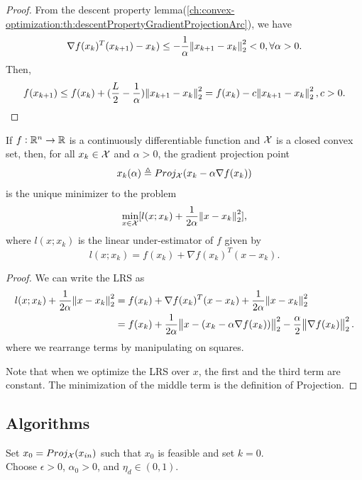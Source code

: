 \begin{refsection}
\begin{proof}
From the descent property lemma(\autoref{ch:convex-optimization:th:descentPropertyGradientProjectionArc}), we have
	$$\nabla f(x_k)^T(x_{k+1}) - x_k) \leq -\frac{1}{\alpha} \norm{x_{k+1} - x_k}_2^2 < 0, \forall \alpha > 0.$$
Then,
$$f(x_{k+1}) \leq f(x_k) + (\frac{L}{2} - \frac{1}{\alpha})\norm{x_{k+1}-x_k}_2^2 = f(x_k) - c\norm{x_{k+1}-x_k}_2^2,c > 0.$$
\end{proof}

\begin{remark}[interpretation]
	
\end{remark}

\begin{lemma}\cite[307]{bertsekas2015convex}
If $f:\mathbb{R}^n\to \mathbb{R}$ is a continuously differentiable function and $\mathcal{X}$ is a closed convex set, then, for all $x_k\in \mathcal{X}$ and $\alpha > 0$, the gradient projection point
$$x_k(\alpha) \triangleq Proj_{\mathcal{X}} (x_k - \alpha \nabla f(x_k))$$
is the unique minimizer to the problem
$$\min_{x\in \mathcal{X}} [l(x;x_k) + \frac{1}{2\alpha} \norm{x - x_k}_2^2],$$
where $l(x;x_k)$ is the linear under-estimator of $f$ given by
$$l(x;x_k) = f(x_k) + \nabla f(x_k)^T (x - x_k).$$
\end{lemma}
\begin{proof}
We can write the LRS as
\begin{align*}
l(x;x_k) + \frac{1}{2\alpha} \norm{x - x_k}_2^2 &= f(x_k) + \nabla f(x_k)^T (x - x_k) + \frac{1}{2\alpha} \norm{x - x_k}_2^2 \\
& = f(x_k) + \frac{1}{2\alpha}\norm{x - (x_k - \alpha \nabla f(x_k))}_2^2 - \frac{\alpha}{2}\norm{\nabla f(x_k)}_2^2.
\end{align*}
where we rearrange terms by manipulating on squares. 

Note that when we optimize the LRS over $x$, the first and the third term are constant. The minimization of the middle term is the definition of Projection.
\end{proof}



\subsection{Algorithms}

\begin{algorithm}[H]
	\SetAlgoLined
	Set $x_0 = Proj_{\mathcal{X}}(x_{in})$ such that $x_0$ is feasible and set $k = 0$. \\
	Choose $\epsilon > 0$, $\alpha_0 > 0$, and $\eta_d\in (0,1)$.
\end{algorithm}
\end{refsection}
